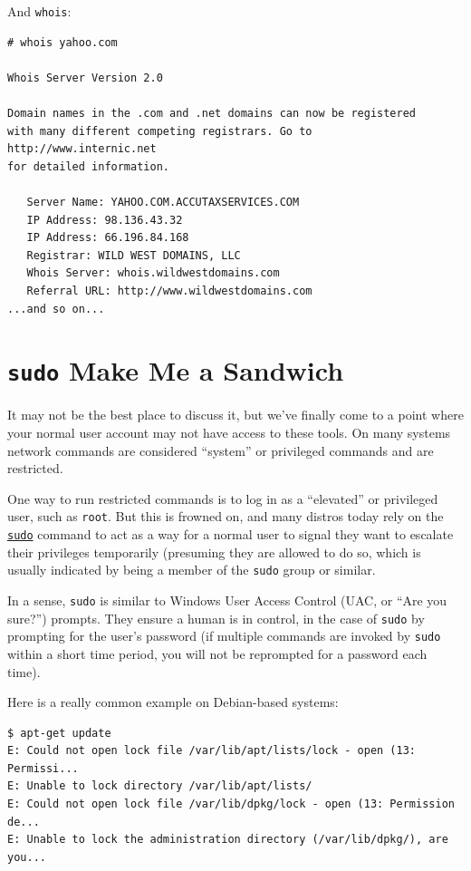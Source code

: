 \documentclass[10pt,]{book}
\numberwithin{figure}{chapter}
\begin{document}
And \texttt{whois}:

\begin{verbatim}
# whois yahoo.com

Whois Server Version 2.0

Domain names in the .com and .net domains can now be registered
with many different competing registrars. Go to http://www.internic.net
for detailed information.

   Server Name: YAHOO.COM.ACCUTAXSERVICES.COM
   IP Address: 98.136.43.32
   IP Address: 66.196.84.168
   Registrar: WILD WEST DOMAINS, LLC
   Whois Server: whois.wildwestdomains.com
   Referral URL: http://www.wildwestdomains.com
...and so on...
\end{verbatim}

\section{\texttt{sudo} Make Me a
Sandwich}\label{sudo-make-me-a-sandwich}

It may not be the best place to discuss it, but we've finally come to a
point where your normal user account may not have access to these tools.
On many systems network commands are considered ``system'' or privileged
commands and are restricted.

One way to run restricted commands is to log in as a ``elevated'' or
privileged user, such as \texttt{root}. But this is frowned on, and many
distros today rely on the
\href{http://linux.die.net/man/8/sudo}{\texttt{sudo}} command to act as
a way for a normal user to signal they want to escalate their privileges
temporarily (presuming they are allowed to do so, which is usually
indicated by being a member of the \texttt{sudo} group or similar.

In a sense, \texttt{sudo} is similar to Windows User Access Control
(UAC, or ``Are you sure?'') prompts. They ensure a human is in control,
in the case of \texttt{sudo} by prompting for the user's password (if
multiple commands are invoked by \texttt{sudo} within a short time
period, you will not be reprompted for a password each time).

Here is a really common example on Debian-based systems:

\begin{verbatim}
$ apt-get update
E: Could not open lock file /var/lib/apt/lists/lock - open (13: Permissi...
E: Unable to lock directory /var/lib/apt/lists/
E: Could not open lock file /var/lib/dpkg/lock - open (13: Permission de...
E: Unable to lock the administration directory (/var/lib/dpkg/), are you...
\end{verbatim}
\end{document}
